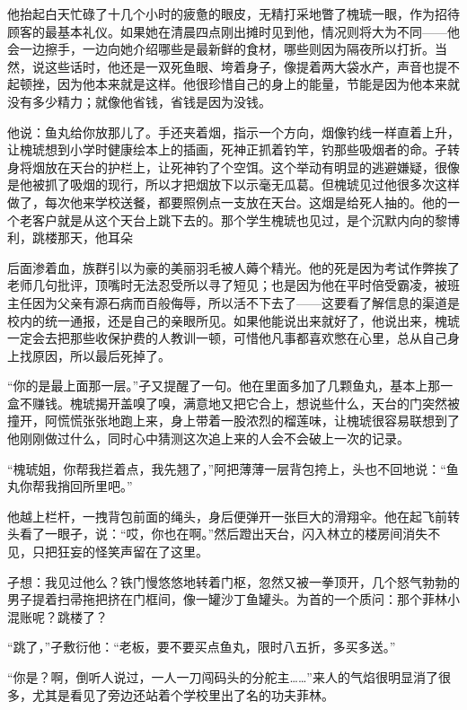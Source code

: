 \documentclass{article}
\begin{document}
他抬起白天忙碌了十几个小时的疲惫的眼皮，无精打采地瞥了槐琥一眼，作为招待顾客的最基本礼仪。如果她在清晨四点刚出摊时见到他，情况则将大为不同——他会一边擦手，一边向她介绍哪些是最新鲜的食材，哪些则因为隔夜所以打折。当然，说这些话时，他还是一双死鱼眼、垮着身子，像提着两大袋水产，声音也提不起顿挫，因为他本来就是这样。他很珍惜自己的身上的能量，节能是因为他本来就没有多少精力；就像他省钱，省钱是因为没钱。

他说：鱼丸给你放那儿了。手还夹着烟，指示一个方向，烟像钓线一样直着上升，让槐琥想到小学时健康绘本上的插画，死神正抓着钓竿，钓那些吸烟者的命。孑转身将烟放在天台的护栏上，让死神钓了个空饵。这个举动有明显的逃避嫌疑，很像是他被抓了吸烟的现行，所以才把烟放下以示毫无瓜葛。但槐琥见过他很多次这样做了，每次他来学校送餐，都要照例点一支放在天台。这烟是给死人抽的。他的一个老客户就是从这个天台上跳下去的。那个学生槐琥也见过，是个沉默内向的黎博利，跳楼那天，他耳朵

\newpage 

后面渗着血，族群引以为豪的美丽羽毛被人薅个精光。他的死是因为考试作弊挨了老师几句批评，顶嘴时无法忍受所以寻了短见；也是因为他在平时倍受霸凌，被班主任因为父亲有源石病而百般侮辱，所以活不下去了——这要看了解信息的渠道是校内的统一通报，还是自己的亲眼所见。如果他能说出来就好了，他说出来，槐琥一定会去把那些收保护费的人教训一顿，可惜他凡事都喜欢憋在心里，总从自己身上找原因，所以最后死掉了。

“你的是最上面那一层。”孑又提醒了一句。他在里面多加了几颗鱼丸，基本上那一盒不赚钱。槐琥揭开盖嗅了嗅，满意地又把它合上，想说些什么，天台的门突然被撞开，阿慌慌张张地跑上来，身上带着一股浓烈的榴莲味，让槐琥很容易联想到了他刚刚做过什么，同时心中猜测这次追上来的人会不会破上一次的记录。

“槐琥姐，你帮我拦着点，我先翘了，”阿把薄薄一层背包挎上，头也不回地说：“鱼丸你帮我捎回所里吧。”

他越上栏杆，一拽背包前面的绳头，身后便弹开一张巨大的滑翔伞。他在起飞前转头看了一眼孑，说：“哎，你也在啊。”然后蹬出天台，闪入林立的楼房间消失不见，只把狂妄的怪笑声留在了这里。

\newpage 

孑想：我见过他么？铁门慢悠悠地转着门枢，忽然又被一拳顶开，几个怒气勃勃的男子提着扫帚拖把挤在门框间，像一罐沙丁鱼罐头。为首的一个质问：那个菲林小混账呢？跳楼了？

“跳了，”孑敷衍他：“老板，要不要买点鱼丸，限时八五折，多买多送。”

“你是？啊，倒听人说过，一人一刀闯码头的分舵主……”来人的气焰很明显消了很多，尤其是看见了旁边还站着个学校里出了名的功夫菲林。
\end{document}
